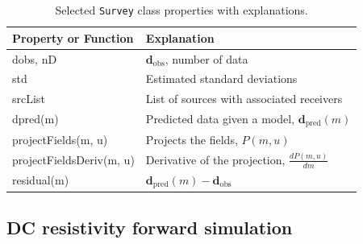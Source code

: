 \documentclass[preprint,review,3p,times,onecolumn,authoryear]{elsarticle}
\newcommand{\Survey}{\texttt{Survey}\xspace}
\newcommand{\dobs}{\mathbf{d}_\text{obs}}
\newcommand{\dpred}{\mathbf{d}_\text{pred}}
\newcommand{\deriv}[2]{\frac{d #1}{d #2}}
\begin{document}
{%
\begin{table}[ht]
\caption{Selected \Survey class properties with explanations.}
\scriptsize
\label{table:Survey}
  \begin{tabular}{  p{2.5cm}  p{4.5cm} }
    \hline

    Property or Function  & Explanation \\ \hline

    dobs, nD                 & $\dobs$, number of data\\
    std                      & Estimated standard deviations\\
    srcList                   & List of sources with associated receivers\\
    dpred(m)                 & Predicted data given a model, $\dpred(m)$\\
    projectFields(m, u)      & Projects the fields, $P(m,u)$\\
    projectFieldsDeriv(m, u) & Derivative of the projection, $\deriv{P(m,u)}{m}$\\
    residual(m)              & $\dpred(m) - \dobs$\\

    \hline
  \end{tabular}
\end{table}
}

\subsection{DC resistivity forward simulation}
\label{sec:DCforward}
\end{document}
